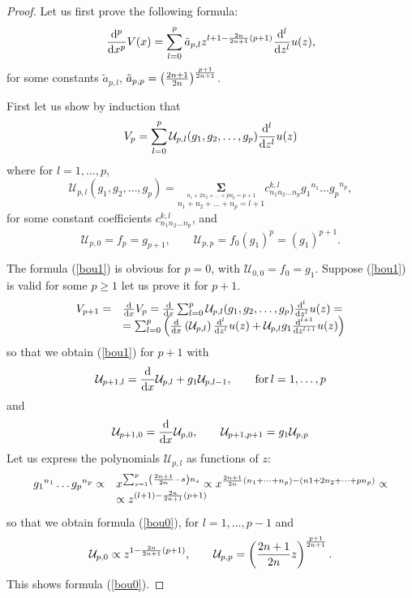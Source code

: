 \documentclass{amsart}
\theoremstyle{definition}
\theoremstyle{remark}
\theoremstyle{remark}
\begin{document}
\begin{proof}
Let us first prove the following formula:
\begin{equation}
{{\rm d}^p\over{\rm d} x^p}V(x)=
\sum_{l=0}^p\tilde a_{p,l}z^{l+1-{2n\over 2n+1}(p+1)}
{{\rm d}^l\over{\rm d} z^l} u(z),
\label{bou0}\end{equation}
for some constants $\tilde a_{p,l}$,
$\tilde a_{p,p}=\left({2n+1\over 2n}\right)^{p+1\over 2n+1}$.

First let us show by induction that
\begin{equation}
V_p=\sum_{l=0}^p{\mathcal U}_{p,l}(g_1,g_2,\dots,g_p)
{{\rm d}^l\over{\rm d} z^l} u(z)
\label{bou1}\end{equation}
where for $l=1,\dots,p$,
$$
{\mathcal U}_{p,l}(g_1,g_2,\dots,g_p)=
\underset{{\overset{
\scriptstyle n_1+2n_2+\dots +p n_p=p+1}
{\scriptstyle n_1+n_2+\dots +n_p=l+1}}}
{{\boldsymbol{\Sigma}}}
c^{k,l}_{n_1 n_2 \dots n_p}
{g_1}^{n_1}\dots{g_p}^{n_p},
$$
for some constant coefficients $c^{k,l}_{n_1 n_2 \dots n_p}$, and
$$
{\mathcal U}_{p,0}= f_{p}= g_{p+1},\qquad
{\mathcal U}_{p,p}= f_0(g_1)^{p}= (g_1)^{p+1}.
$$

The formula (\ref{bou1}) is obvious for $p=0$, with
${\mathcal U}_{0,0}=f_0=g_1$. Suppose (\ref{bou1}) is valid for some $p\geq 1$
let us prove it for $p+1$.
$$
\begin{array}{ll}
V_{p+1}=&{{\rm d}\over{\rm d}x}V_p=
{{\rm d}\over{\rm d}x}
\sum_{l=0}^p{\mathcal U}_{p,l}(g_1,g_2,\dots,g_p)
{{\rm d}^l\over{\rm d} z^l} u(z)=\\
&= \sum_{l=0}^p \left({{\rm d}\over{\rm d}x}\left({\mathcal U}_{p,l}  \right)
{{\rm d}^l\over{\rm d} z^l} u(z) + {\mathcal U}_{p,l} g_1
{{\rm d}^{l+1}\over{\rm d} z^{l+1}} u(z)\right)\\
\end{array}
$$
so that we obtain (\ref{bou1}) for $p+1$ with
$$
{\mathcal U}_{p+1,l}={{\rm d}\over{\rm d}x}{\mathcal U}_{p,l}+
g_1 {\mathcal U}_{p,l-1},\qquad \hbox{for}\, l=1,\dots,p
$$
and
$$
{\mathcal U}_{p+1,0}={{\rm d}\over{\rm d}x}{\mathcal U}_{p,0},\qquad
{\mathcal U}_{p+1,p+1}= g_1{\mathcal U}_{p,p}
$$
Let us express the polynomials ${\mathcal U}_{p,l}$ as functions of $z$:
$$
\begin{array}{ll}
{g_1}^{n_1}\dots{g_p}^{n_p}\propto&
x^{\sum_{s=1}^p\left({2n+1\over 2n}-s\right)n_s} \propto
x^{{2n+1\over 2n}(n_1+\dots+n_p)-(n1+2 n_2+\dots +p n_p)}\propto\\
&\propto z^{(l+1)-{2n\over 2n+1}(p+1)}\end{array}
$$
so that we obtain formula (\ref{bou0}), for $l=1,\dots,p-1$ and
$$
{\mathcal U}_{p,0}\propto z^{1-{2n\over 2n+1}(p+1)},\qquad
{\mathcal U}_{p,p}=\left({2n+1\over 2n}z\right)^{p+1\over 2n+1}.
$$
This shows formula (\ref{bou0}).


\end{proof}
\end{document}
